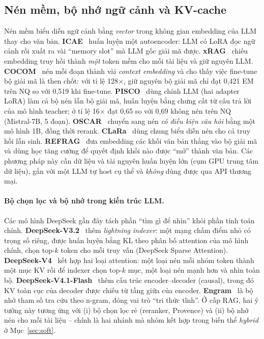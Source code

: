 \subsection{Nén mềm, bộ nhớ ngữ cảnh và KV-cache}

Nén mềm biểu diễn ngữ cảnh bằng \emph{vector} trong không gian embedding của LLM thay cho văn bản.
\textbf{ICAE}~\cite{ge2024icae} huấn luyện một autoencoder: LLM có LoRA đọc ngữ cảnh rồi xuất ra vài
``memory slot'' mà LLM gốc giải mã được. \textbf{xRAG}~\cite{cheng2024xrag} chiếu embedding truy hồi
thành \emph{một} token mềm cho mỗi tài liệu và giữ nguyên LLM. \textbf{COCOM}~\cite{rau2025cocom} nén mỗi
đoạn thành vài \emph{context embedding} và cho thấy việc fine-tune bộ giải mã là then chốt: với tỉ lệ
128$\times$, giữ nguyên bộ giải mã chỉ đạt 0,421 EM trên NQ so với 0,519 khi fine-tune.
\textbf{PISCO}~\cite{louis2025pisco} dùng chính LLM (hai adapter LoRA) làm cả bộ nén lẫn bộ giải mã,
huấn luyện bằng chưng cất từ câu trả lời của mô hình teacher; ở tỉ lệ 16$\times$ đạt 0,65 so với 0,69
không nén trên NQ (Mistral-7B, 5 đoạn). \textbf{OSCAR}~\cite{louis2025oscar} chuyển sang nén
\emph{có điều kiện câu hỏi} bằng một mô hình 1B, đồng thời rerank. \textbf{CLaRa}~\cite{he2025clara}
dùng chung biểu diễn nén cho cả truy hồi lẫn sinh. \textbf{REFRAG}~\cite{lin2025refrag} đưa embedding các
khối văn bản thẳng vào bộ giải mã và dùng học tăng cường để quyết định khối nào được ``mở'' thành văn
bản. Các phương pháp này cần dữ liệu và tài nguyên huấn luyện lớn (cụm GPU trung tâm dữ liệu), gắn với một
LLM tự host cụ thể và \emph{không} dùng được qua API thương mại.

\paragraph{Bộ chọn lọc và bộ nhớ trong kiến trúc LLM.} Các mô hình DeepSeek gần đây tách phần ``tìm
gì để nhìn'' khỏi phần tính toán chính. \textbf{DeepSeek-V3.2}~\cite{deepseek2025v32} thêm \emph{lightning
indexer}: một mạng chấm điểm nhỏ có trọng số riêng, được huấn luyện bằng KL theo phân bố attention của
mô hình chính, chọn top-$k$ token cho mỗi truy vấn (DeepSeek Sparse Attention).
\textbf{DeepSeek-V4}~\cite{deepseek2026v4} kết hợp hai loại attention: một loại nén mỗi nhóm token thành
một mục KV rồi để indexer chọn top-$k$ mục, một loại nén mạnh hơn và nhìn toàn bộ.
\textbf{DeepSeek-V4.1-Flash}~\cite{deepseek2026v41flash} thêm cấu trúc encoder--decoder (causal), trong đó
KV toàn cục của decoder được chiếu từ tầng giữa của encoder. \textbf{Engram}~\cite{cheng2026engram} là bộ
nhớ tham số tra cứu theo n-gram, đóng vai trò ``tri thức tĩnh''. Ở cấp RAG, hai ý tưởng này tương ứng
với (i) bộ chọn lọc rẻ (reranker, Provence) và (ii) bộ nhớ nén cho mỗi tài liệu -- chính là hai nhánh
mà nhóm kết hợp trong biến thể \emph{hybrid} ở Mục~\ref{sec:soft}.


